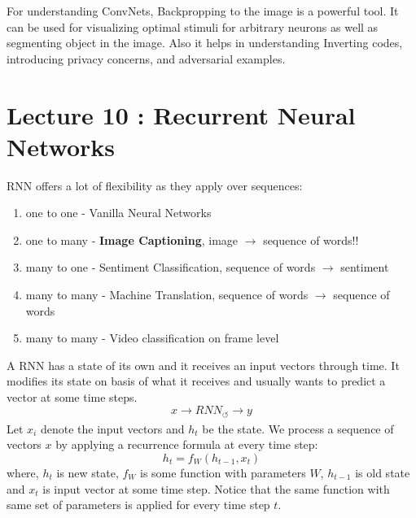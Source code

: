 \documentclass[12pt,a4paper]{article}
\begin{document}
For understanding ConvNets, Backpropping to the image is a powerful tool. It can be used for visualizing optimal stimuli for arbitrary neurons as well as segmenting object in the image. Also it helps in understanding Inverting codes, introducing privacy concerns, and adversarial examples.

\section{Lecture 10 : Recurrent Neural Networks}
RNN offers a lot of flexibility as they apply over sequences:
\begin{enumerate}
    \item one to one - Vanilla Neural Networks
    \item one to many - \textbf{Image Captioning}, image $\xrightarrow{}$ sequence of words!!
    \item many to one - Sentiment Classification, sequence of words $\xrightarrow{}$ sentiment
    \item many to many - Machine Translation, sequence of words $\xrightarrow{}$ sequence of words
    \item many to many - Video classification on frame level
\end{enumerate}
A RNN has a state of its own and it receives an input vectors through time. It modifies its state on basis of what it receives and usually wants to predict a vector at some time steps. 
\begin{equation*}
    x \xrightarrow[]{} RNN_\circlearrowleft \xrightarrow[]{} y
\end{equation*}
Let $x_i$ denote the input vectors and $h_t$ be the state. We process a sequence of vectors $x$ by applying a recurrence formula at every time step:
\begin{equation*}
    h_t = f_{W}(h_{t-1},x_t)
\end{equation*}
where, $h_t$ is new state, $f_W$ is some function with parameters $W$, $h_{t-1}$ is old state and $x_t$ is input vector at some time step. Notice that the same function with same set of parameters is applied for every time step $t$.
\end{document}
